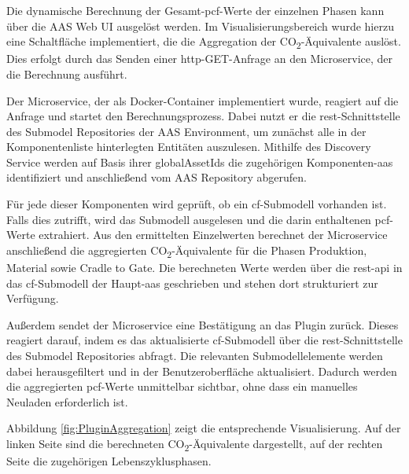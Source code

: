 Die dynamische Berechnung der Gesamt-\acs{pcf}-Werte der einzelnen Phasen kann über die AAS Web UI ausgelöst werden.
Im Visualisierungsbereich wurde hierzu eine Schaltfläche implementiert, die die Aggregation der CO\textsubscript{2}-Äquivalente auslöst. 
Dies erfolgt durch das Senden einer \acs{http}-GET-Anfrage an den Microservice, der die Berechnung ausführt.

Der Microservice, der als Docker-Container implementiert wurde, reagiert auf die Anfrage und startet den Berechnungsprozess. 
Dabei nutzt er die \acs{rest}-Schnittstelle des Submodel Repositories der AAS Environment, um zunächst alle in der Komponentenliste hinterlegten Entitäten auszulesen. 
Mithilfe des Discovery Service werden auf Basis ihrer globalAssetIds die zugehörigen Komponenten-\acs{aas} identifiziert und anschließend vom AAS Repository abgerufen.

Für jede dieser Komponenten wird geprüft, ob ein \acs{cf}-Submodell vorhanden ist. 
Falls dies zutrifft, wird das Submodell ausgelesen und die darin enthaltenen \acs{pcf}-Werte extrahiert. 
Aus den ermittelten Einzelwerten berechnet der Microservice anschließend die aggregierten CO\textsubscript{2}-Äquivalente für die Phasen Produktion, Material sowie Cradle to Gate. 
Die berechneten Werte werden über die \acs{rest}-\acs{api} in das \acs{cf}-Submodell der Haupt-\acs{aas} geschrieben und stehen dort strukturiert zur Verfügung.

Außerdem sendet der Microservice eine Bestätigung an das Plugin zurück. 
Dieses reagiert darauf, indem es das aktualisierte \acs{cf}-Submodell über die \acs{rest}-Schnittstelle des Submodel Repositories abfragt. 
Die relevanten Submodellelemente werden dabei herausgefiltert und in der Benutzeroberfläche aktualisiert. 
Dadurch werden die aggregierten \acs{pcf}-Werte unmittelbar sichtbar, ohne dass ein manuelles Neuladen erforderlich ist.

Abbildung \ref{fig:PluginAggregation} zeigt die entsprechende Visualisierung. 
Auf der linken Seite sind die berechneten CO\textsubscript{2}-Äquivalente dargestellt, auf der rechten Seite die zugehörigen Lebenszyklusphasen.

